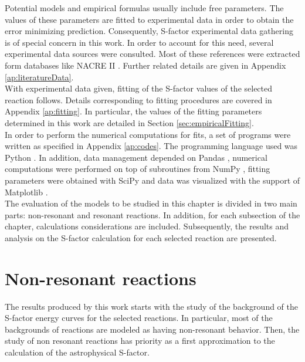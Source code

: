 \documentclass[openany]{book}
\begin{document}
Potential models and empirical formulas usually include free parameters. The values of these parameters are fitted to experimental data in order to obtain the error minimizing prediction. Consequently, S-factor experimental data gathering is of special concern in this work. In order to account for this need, several experimental data sources were consulted. Most of these references were extracted form databases like NACRE II \cite{xu_takahashi_goriely_arnould_ohta_utsunomiya_2013}. Further related details are given in Appendix \ref{ap:literatureData}. \\ 

With experimental data given, fitting of the S-factor values of the selected reaction follows. Details corresponding to fitting procedures are covered in Appendix \ref{ap:fitting}.  In particular, the values of the fitting parameters determined in this work are detailed in Section \ref{sec:empiricalFitting}.  \\

In order to perform the numerical computations for fits, a set of programs were written as specified in Appendix \ref{ap:codes}. The programming language used was Python \cite{rossum_drake_2009}. In addition, data management depended on Pandas \cite{mckinney_2010}, numerical computations were performed on top of subroutines from NumPy  \cite{harris_millman_vanderwalt_gommers_virtanen_cournapeau_wieser_taylor_berg_smith_et_2020}, fitting parameters were obtained with SciPy \cite{virtanen_gommers_oliphant_haberland_reddy_cournapeau_burovski_peterson_weckesser_bright_et_2020} and data was visualized with the support of Matplotlib \cite{hunter_2007}. \\

The evaluation of the models to be studied in this chapter is divided in two main parts: non-resonant and resonant reactions.  In addition, for each subsection of the chapter, calculations considerations are included. Subsequently, the results and analysis on the S-factor calculation for each  selected reaction are presented.

\section{Non-resonant reactions} \label{sec:nonResonant}

The  results produced by this work starts with the study of the background of the S-factor energy curves for the selected reactions. In particular, most of the backgrounds of reactions are modeled as having non-resonant behavior. Then, the study of non resonant reactions has priority as a first approximation to the calculation of the astrophysical S-factor. \\
\end{document}
